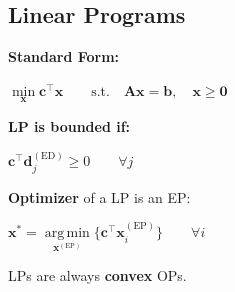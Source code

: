 \documentclass[english]{latex4ei/latex4ei_sheet}
\DeclareMathOperator*{\argmin}{arg\,min}
\begin{document}
\begin{sectionbox}
	\subsection{Linear Programs}
	\textbf{Standard Form:}
	\begin{center}
		$\min\limits_{\bm{x}} \bm{c}^\intercal\bm{x} \qquad \text{s.t.} \quad \bm{A}\bm{x}=\bm{b}, \quad \bm{x}\geq\bm{0}$
	\end{center}
	\textbf{LP is bounded if:}
	\begin{center}
		$\bm{c}^\intercal\bm{d}^{(\text{ED})}_j \geq 0 \qquad \forall j$
	\end{center}
	\textbf{Optimizer} of a LP is an EP:
	\begin{center}
		$\bm{x}^* = \argmin\limits_{\bm{x}^{(\text{EP})}}\{\bm{c}^\intercal\bm{x}^{(\text{EP})}_i\} \qquad \forall i$
	\end{center}
	LPs are always \textbf{convex} OPs. \\
	
\end{sectionbox}
\end{document}
